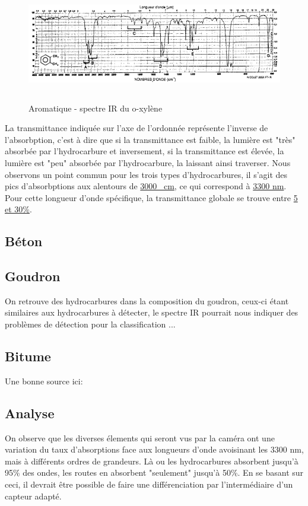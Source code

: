 \begin{figure}[H]
    \centering
    \includegraphics[height=5cm,angle=90]{assets/figures/aromatique.png}
    \caption{Aromatique - spectre IR du o-xylène \cite{Hydrocarbures}}
\end{figure}

\newpage
La transmittance indiquée sur l'axe de l'ordonnée représente l'inverse de l'absorbption, c'est à dire que si la transmittance est faible, la lumière
est "très" absorbée par l'hydrocarbure et inversement, si la transmittance est élevée, la lumière est "peu" absorbée par l'hydrocarbure, la laissant ainsi traverser.
Nous observons un point commun pour les trois types d'hydrocarbures, il s'agit des pics d'absorbptions aux alentours de \underline{3000 \si{\per\centi\metre}}, ce qui correspond à \underline{3300 \si{\nano\metre}}.\\
Pour cette longueur d'onde spécifique, la transmittance globale se trouve entre \underline{5 et 30\%}.

\subsection{Béton}

\subsection{Goudron}
On retrouve des hydrocarbures dans la composition du goudron, ceux-ci étant similaires aux hydrocarbures à détecter, le spectre IR pourrait nous indiquer des problèmes de détection pour la classification ...

\subsection{Bitume}
Une bonne source ici: \cite{Bitume}
\\

\subsection{Analyse}
On observe que les diverses élements qui seront vus par la caméra ont une variation du taux d'absorptions face aux longueurs d'onde avoisinant les
3300 \si{\nano\metre}, mais à différents ordres de grandeurs. Là ou les hydrocarbures absorbent jusqu'à 95\% des ondes, les routes en absorbent "seulement" jusqu'à 50\%.
En se basant sur ceci, il devrait être possible de faire une différenciation par l'intermédiaire d'un capteur adapté.